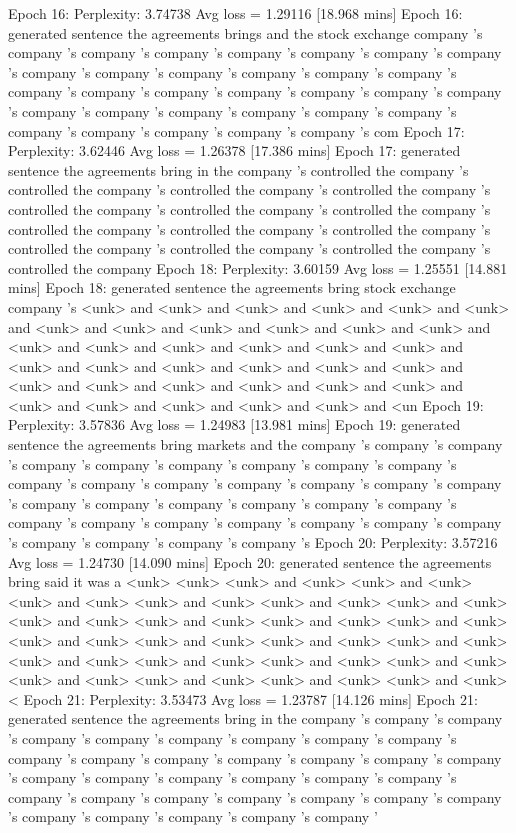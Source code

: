 \documentclass{article}
\begin{document}
Epoch 16: Perplexity: 3.74738 Avg loss = 1.29116 [18.968 mins]
Epoch 16: generated sentence 
the agreements brings and the stock exchange company 's company 's company 's company 's company 's company 's company 's company 's company 's company 's company 's company 's company 's company 's company 's company 's company 's company 's company 's company 's company 's company 's company 's company 's company 's company 's company 's company 's company 's company 's company 's company 's com
Epoch 17: Perplexity: 3.62446 Avg loss = 1.26378 [17.386 mins]
Epoch 17: generated sentence 
the agreements bring in the company 's controlled the company 's controlled the company 's controlled the company 's controlled the company 's controlled the company 's controlled the company 's controlled the company 's controlled the company 's controlled the company 's controlled the company 's controlled the company 's controlled the company 's controlled the company 's controlled the company 
Epoch 18: Perplexity: 3.60159 Avg loss = 1.25551 [14.881 mins]
Epoch 18: generated sentence 
the agreements bring stock exchange company 's <unk> and <unk> and <unk> and <unk> and <unk> and <unk> and <unk> and <unk> and <unk> and <unk> and <unk> and <unk> and <unk> and <unk> and <unk> and <unk> and <unk> and <unk> and <unk> and <unk> and <unk> and <unk> and <unk> and <unk> and <unk> and <unk> and <unk> and <unk> and <unk> and <unk> and <unk> and <unk> and <unk> and <unk> and <unk> and <un
Epoch 19: Perplexity: 3.57836 Avg loss = 1.24983 [13.981 mins]
Epoch 19: generated sentence 
the agreements bring markets and the company 's company 's company 's company 's company 's company 's company 's company 's company 's company 's company 's company 's company 's company 's company 's company 's company 's company 's company 's company 's company 's company 's company 's company 's company 's company 's company 's company 's company 's company 's company 's company 's company 's 
Epoch 20: Perplexity: 3.57216 Avg loss = 1.24730 [14.090 mins]
Epoch 20: generated sentence 
the agreements bring said it was a <unk> <unk> <unk> and <unk> <unk> and <unk> <unk> and <unk> <unk> and <unk> <unk> and <unk> <unk> and <unk> <unk> and <unk> <unk> and <unk> <unk> and <unk> <unk> and <unk> <unk> and <unk> <unk> and <unk> <unk> and <unk> <unk> and <unk> <unk> and <unk> <unk> and <unk> <unk> and <unk> <unk> and <unk> <unk> and <unk> <unk> and <unk> <unk> and <unk> <unk> and <unk> <
Epoch 21: Perplexity: 3.53473 Avg loss = 1.23787 [14.126 mins]
Epoch 21: generated sentence 
the agreements bring in the company 's company 's company 's company 's company 's company 's company 's company 's company 's company 's company 's company 's company 's company 's company 's company 's company 's company 's company 's company 's company 's company 's company 's company 's company 's company 's company 's company 's company 's company 's company 's company 's company 's company '
\end{document}
